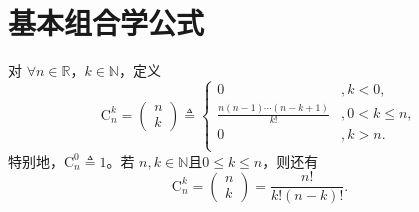 \documentclass[../../main.tex]{subfiles}%
\begin{document}
\section{基本组合学公式}

\begin{definition}[组合数定义的扩充]\label{definition:组合数定义的扩充}
对 \( \forall n \in \mathbb{R} \)，\( k \in \mathbb{N} \)，定义
\[
\mathrm{C}_{n}^{k} = \begin{pmatrix} n \\ k \end{pmatrix} \triangleq \begin{cases}
0&,k<0,\\
\frac{n(n - 1) \cdots (n - k + 1)}{k!}&,0< k\leqslant n ,\\
0&,k>n.\\
\end{cases}
\]
特别地，\( \mathrm{C}_{n}^{0} \triangleq 1 \)。若 \( n, k \in \mathbb{N} \)且$0\leqslant k\leqslant n$，则还有
\[
\mathrm{C}_{n}^{k} = \begin{pmatrix} n \\ k \end{pmatrix} = \frac{n!}{k! (n - k)!}.
\]
\end{definition}
\end{document}
